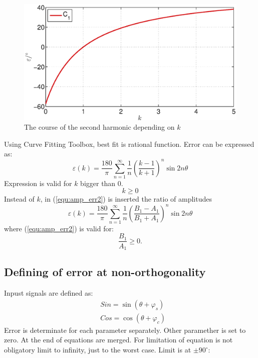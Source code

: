 \documentclass[a4paper]{article}
\begin{document}
\begin{figure}[!htb]
	\begin{center}
		\includegraphics[width=\linewidth]{./Slike/amp.eps}
		\caption{The course of the second harmonic depending on $k$} \label{fig:amp}
	\end{center}
\end{figure}

Using Curve Fitting Toolbox, best fit is rational function. Error can be expressed as:
\begin{equation}
\label{equ:amp_err}
\varepsilon(k) =\frac{180}{\pi}\sum_{n=1}^{\infty}\frac{1}{n}(\frac{k-1}{k+1})^n \sin 2 n \theta
\end{equation}
Expression is valid for  $k$ bigger than 0.$$k \geq 0$$
Instead of  $k$, in (\ref{equ:amp_err2}) is  inserted the ratio of amplitudes
\begin{equation}
\label{equ:amp_err2}
\varepsilon(k) =\frac{180}{\pi}\sum_{n=1}^{\infty}\frac{1}{n}(\frac{B_1-A_1}{B_1+A_1})^n \sin 2 n \theta
\end{equation}
where (\ref{equ:amp_err2}) is valid for: $$\frac{B_1}{A_1} \geq 0.$$

\subsection{Defining of error at non-orthogonality}

Inpust signals are defined as:
\begin{eqnarray}
\label{equ:def_sin_fis}
&Sin = \sin(\theta + \varphi_{s})\\
\label{equ:def_cos_fis}
&Cos =\cos(\theta+\varphi_{c})
\end{eqnarray}
Error is determinate for each parameter separately. Other paramether is set to zero. At the end of equations are merged. For limitation of equation is not obligatory limit to infinity, just to the worst case. Limit is at $\pm 90^\circ$:
\end{document}

